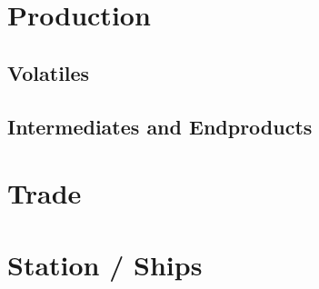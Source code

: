 \section{Production}

\subsection{Volatiles}

\subsection{Intermediates and Endproducts}

\section{Trade}

\section{Station / Ships}
